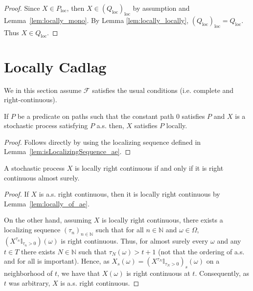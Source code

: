 \begin{proof}\leanok
Since $X \in P_{\mathrm{loc}}$, then $X \in (Q_{\mathrm{loc}})_{\mathrm{loc}}$ by assumption and Lemma~\ref{lem:locally_mono}.
By Lemma \ref{lem:locally_locally}, $(Q_{\mathrm{loc}})_{\mathrm{loc}} = Q_{\mathrm{loc}}$.
Thus $X \in Q_{\mathrm{loc}}$.
\end{proof}

\section{Locally Cadlag}

We in this section assume $\mathcal{F}$ satisfies the usual conditions (i.e. complete and right-continuous).

\begin{lemma}\label{lem:locally_of_ae}
  \leanok
  If $P$ be a predicate on paths such that the constant path $0$ satisfies $P$ and $X$ is a stochastic process satisfying $P$ a.s. then, $X$ satisfies $P$ locally.
\end{lemma}

\begin{proof}\leanok
  Follows directly by using the localizing sequence defined in Lemma~\ref{lem:isLocalizingSequence_ae}.
\end{proof}

\begin{lemma}\label{lem:locally_rightContinuous}
  \leanok
  A stochastic process $X$ is locally right continuous if and only if it is right continuous almost surely.
\end{lemma}

\begin{proof}
  \leanok
  If $X$ is a.s. right continuous, then it is locally right continuous by Lemma~\ref{lem:locally_of_ae}.

  On the other hand, assuming $X$ is locally right continuous, there exists a localizing sequence
  $(\tau_n)_{n \in \mathbb{N}}$ such that for all $n \in \mathbb{N}$ and $\omega \in \Omega$, $(X^{\tau_n}\mathbb{I}_{\tau_n > 0})(\omega)$ is right continuous.
  Thus, for almost surely every $\omega$ and any $t \in T$ there exists $N \in \mathbb{N}$ such that $\tau_N(\omega) > t + 1$ (not that the ordering of a.s. and for all is important). Hence, as
  $X_s(\omega) = (X^{\tau_N}\mathbb{I}_{\tau_N > 0})_s(\omega)$ on a neighborhood of $t$, we have that $X(\omega)$ is right continuous at $t$.
  Consequently, as $t$ was arbitrary, $X$ is a.s. right continuous.
\end{proof}

